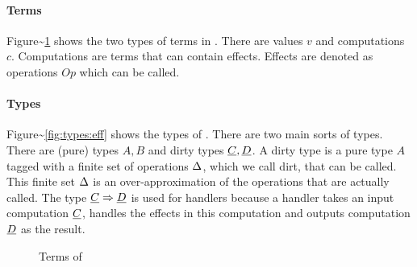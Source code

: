 \documentclass[sigplan,10pt]{acmart}\settopmatter{printfolios=true}
\begin{document}
\paragraph{Terms}

Figure\textasciitilde{}\ref{fig:terms:eff} shows the two types of terms
in \eff. There are values \(v\) and computations \(c\). Computations are
terms that can contain effects. Effects are denoted as operations \(Op\)
which can be called.

\paragraph{Types}

Figure\textasciitilde{}\ref{fig:types:eff} shows the types of \eff.
There are two main sorts of types. There are (pure) types \(A, B\) and
dirty types \(\underline{C}, \underline{D}\). A dirty type is a pure type \(A\) tagged with a
finite set of operations \(\Delta\), which we call dirt, that can be
called. This finite set \(\Delta\) is an over-approximation of the
operations that are actually called. The type \(\underline{C} \Rightarrow \underline{D}\) is used for
handlers because a handler takes an input computation \(\underline{C}\), handles
the effects in this computation and outputs computation \(\underline{D}\) as the
result.

\begin{figure}[h]
\begin{center}
\end{center}
\caption{Terms of \eff}\label{fig:terms:eff}
\end{figure}
\end{document}
